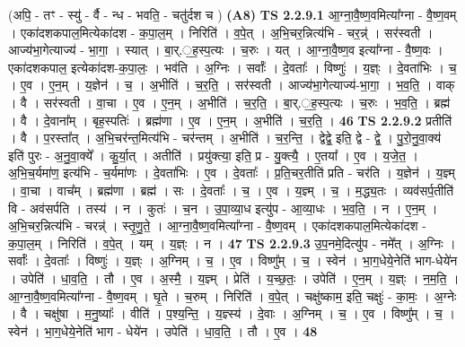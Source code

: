 \documentclass[17pt]{extarticle}
\begin{document}
                  \newline
                      (अपि॒ - तꣳ - स्यु॑ - र्वै - न्ध - भवति॒ - चतु॑र्दश च )  \textbf{(A8)} \newline \newline
                                \textbf{ TS 2.2.9.1} \newline
                  आ॒ग्ना॒वै॒ष्ण॒वमित्या᳚ग्ना - वै॒ष्ण॒वम् । एका॑दशकपाल॒मित्येका॑दश - क॒पा॒ल॒म् । निरिति॑ । व॒पे॒त् । अ॒भि॒चर॒न्नित्य॑भि - चर॒न्न्॑ । सर॑स्वती । आज्य॑भा॒गेत्याज्य॑ - भा॒गा॒ । स्यात् । बा॒र्.॒ह॒स्प॒त्यः । च॒रुः । यत् । आ॒ग्ना॒वै॒ष्ण॒व इत्या᳚ग्ना - वै॒ष्ण॒वः । एका॑दशकपाल॒ इत्येका॑दश-क॒पा॒लः॒ । भव॑ति । अ॒ग्निः । सर्वाः᳚ । दे॒वताः᳚ । विष्णुः॑ । य॒ज्ञ्ः । दे॒वता॑भिः । च॒ । ए॒व । ए॒न॒म् । य॒ज्ञेन॑ । च॒ । अ॒भीति॑ । च॒र॒ति॒ । सर॑स्वती । आज्य॑भा॒गेत्याज्य॑-भा॒गा॒ । भ॒व॒ति॒ । वाक् । वै । सर॑स्वती । वा॒चा । ए॒व । ए॒न॒म् । अ॒भीति॑ । च॒र॒ति॒ । बा॒र्.॒ह॒स्प॒त्यः । च॒रुः । भ॒व॒ति॒ । ब्रह्म॑ । वै । दे॒वाना᳚म् । बृह॒स्पतिः॑ । ब्रह्म॑णा । ए॒व । ए॒न॒म् । अ॒भीति॑ । च॒र॒ति॒ । \textbf{  46} \newline
                  \newline
                                \textbf{ TS 2.2.9.2} \newline
                  प्रतीति॑ । वै । प॒रस्ता᳚त् । अ॒भि॒चर॑न्त॒मित्य॑भि - चर॑न्तम् । अ॒भीति॑ । च॒र॒न्ति॒ । द्वेद्वे॒ इति॒ द्वे - द्वे॒ । पु॒रो॒नु॒वा॒क्य॑ इति॑ पुरः - अ॒नु॒वा॒क्ये᳚ । कु॒र्या॒त् । अतीति॑ । प्रयु॑क्त्या॒ इति॒ प्र - यु॒क्त्यै॒ । ए॒तया᳚ । ए॒व । य॒जे॒त॒ । अ॒भि॒च॒र्यमा॑ण॒ इत्य॑भि - च॒र्यमा॑णः । दे॒वता॑भिः । ए॒व । दे॒वताः᳚ । प्र॒ति॒चर॒तीति॑ प्रति - चर॑ति । य॒ज्ञेन॑ । य॒ज्ञ्म् । वा॒चा । वाच᳚म् । ब्रह्म॑णा । ब्रह्म॑ । सः । दे॒वताः᳚ । च॒ । ए॒व । य॒ज्ञ्म् । च॒ । म॒द्ध्य॒तः । व्यव॑सर्प॒तीति॑ वि - अव॑सर्पति । तस्य॑ । न । कुतः॑ । च॒न । उ॒पा॒व्या॒ध इत्यु॑प - आ॒व्या॒धः । भ॒व॒ति॒ । न । ए॒न॒म् । अ॒भि॒चर॒न्नित्य॑भि - चरन्न्॑ । स्तृ॒णु॒ते॒ । आ॒ग्ना॒वै॒ष्ण॒वमित्या᳚ग्ना - वै॒ष्ण॒वम् । एका॑दशकपाल॒मित्येका॑दश - क॒पा॒ल॒म् । निरिति॑ । व॒पे॒त् । यम् । य॒ज्ञ्ः । न । \textbf{  47} \newline
                  \newline
                                \textbf{ TS 2.2.9.3} \newline
                  उ॒प॒नमे॒दित्यु॑प - नमे᳚त् । अ॒ग्निः । सर्वाः᳚ । दे॒वताः᳚ । विष्णुः॑ । य॒ज्ञ्ः । अ॒ग्निम् । च॒ । ए॒व । विष्णु᳚म् । च॒ । स्वेन॑ । भा॒ग॒धेये॒नेति॑ भाग-धेये॑न । उपेति॑ । धा॒व॒ति॒ । तौ । ए॒व । अ॒स्मै॒ । य॒ज्ञ्म् । प्रेति॑ । य॒च्छ॒तः॒ । उपेति॑ । ए॒न॒म् । य॒ज्ञ्ः । न॒म॒ति॒ । आ॒ग्ना॒वै॒ष्ण॒वमित्या᳚ग्ना - वै॒ष्ण॒वम् । घृ॒ते । च॒रुम् । निरिति॑ । व॒पे॒त् । चक्षु॑ष्काम॒ इति॒ चक्षुः॑ - का॒मः॒ । अ॒ग्नेः । वै । चक्षु॑षा । म॒नु॒ष्याः᳚ । वीति॑ । प॒श्य॒न्ति॒ । य॒ज्ञ्स्य॑ । दे॒वाः । अ॒ग्निम् । च॒ । ए॒व । विष्णु᳚म् । च॒ । स्वेन॑ । भा॒ग॒धेये॒नेति॑ भाग - धेये॑न । उपेति॑ । धा॒व॒ति॒ । तौ । ए॒व । \textbf{  48} \newline
\end{document}
